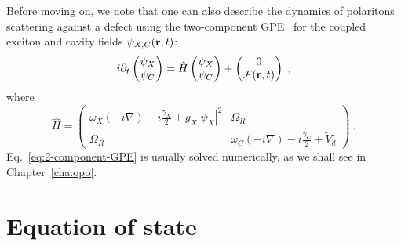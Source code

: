 Before moving on, we note that one can also describe the dynamics of
polaritons scattering against a defect using the two-component
GPE~\cite{Whittaker_2005,Carusotto_2013} for the coupled exciton and
cavity fields $\psi_{X,C} (\mathbf{r},t)$:
%
\begin{equation}\label{eq:2-component-GPE}
  i\partial_t \begin{pmatrix} \psi_X \\ \psi_C \end{pmatrix} =
  \hat{H} \begin{pmatrix} \psi_X \\ \psi_C \end{pmatrix}
  + \begin{pmatrix} 0 \\ \mathcal{F}(\mathbf{r},t) \end{pmatrix} \; ,
\end{equation}
%
where
%
\begin{equation}
  \hat{H} = \begin{pmatrix} \omega_{X}(-i\nabla) - i
    \frac{\gamma_X}{2} + g_X |\psi_X|^2 & \Omega_R \\ \Omega_R &
    \omega_C(-i\nabla) - i \frac{\gamma_C}{2} + \tilde{V}_d \end{pmatrix} \; .
\end{equation}
%
Eq.~\eqref{eq:2-component-GPE} is usually solved numerically, as we
shall see in Chapter~\ref{cha:opo}.

\section{Equation of state}
\label{sec:eq-state}

